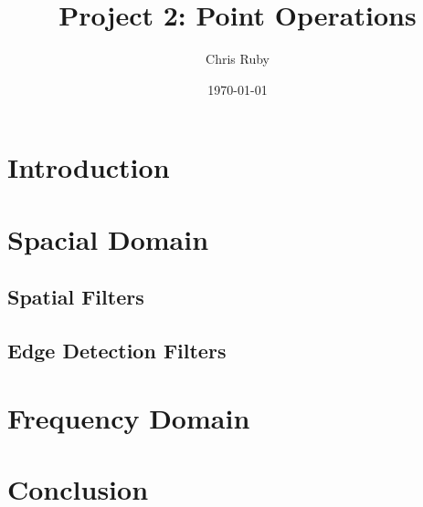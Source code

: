 \documentclass[letterpaper,12pt]{article}
\begin{document}
\title{Project 2: Point Operations}
\author{Chris Ruby}
\date{\today}
\maketitle


\section{Introduction}

\section{Spacial Domain}
\subsection{Spatial Filters}
\subsection{Edge Detection Filters}

\section{Frequency Domain}
	
\section{Conclusion}
\end{document}
